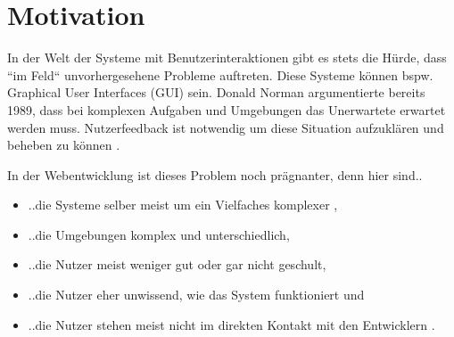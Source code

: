 \section{Motivation}

In der Welt der Systeme mit Benutzerinteraktionen gibt es stets die Hürde, dass ``im Feld`` unvorhergesehene Probleme auftreten. Diese Systeme können bspw. Graphical User Interfaces (GUI) sein. Donald Norman \cite{TheProblemOfAutomation} argumentierte bereits 1989, dass bei komplexen Aufgaben und Umgebungen das Unerwartete erwartet werden muss. Nutzerfeedback ist notwendig um diese Situation aufzuklären und beheben zu können \cite{AnErrorReportingAndFeedbackComponent}.

In der Webentwicklung ist dieses Problem noch prägnanter, denn hier sind..
\begin{itemize}
	\item ..die Systeme selber meist um ein Vielfaches komplexer \cite{ManagingTheComplexityOfWebSystemsDevelopment},
	\item ..die Umgebungen komplex und unterschiedlich,
	\item ..die Nutzer meist weniger gut oder gar nicht geschult,
	\item ..die Nutzer eher unwissend, wie das System funktioniert \cite{AnErrorReportingAndFeedbackComponent} und
	\item ..die Nutzer stehen meist nicht im direkten Kontakt mit den Entwicklern \cite{EndUsersAsUnwittingSoftwareDevelopers}.
\end{itemize}

